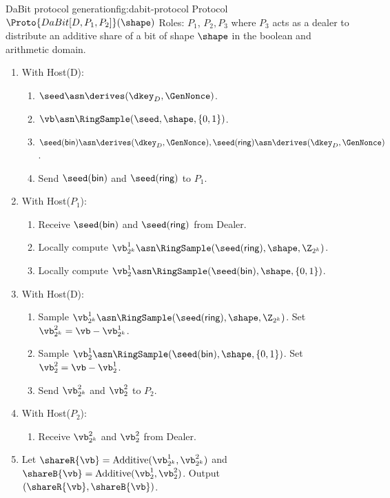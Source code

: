 \begin{Boxfig}{DaBit protocol generation}{fig:dabit-protocol}
  {Protocol $\Proto{DaBit[D, P_1, P_2]}(\shape)$}
  Roles: $P_1$, $P_2, P_3$ where $P_3$ acts as a dealer to distribute
  an additive share of a bit of shape $\shape$ in the boolean and arithmetic domain.
  \begin{enumerate}
  \item With Host(D):
  \begin{enumerate}
    \item $\seed \asn \derives(\dkey_D, \GenNonce)$.
    \item $\vb \asn \RingSample(\seed, \shape, \{0, 1\})$.
    \item $\seed(\textsf{bin}) \asn \derives(\dkey_D, \GenNonce), \seed(\textsf{ring}) \asn \derives(\dkey_D, \GenNonce)$.
    \item Send $\seed(\textsf{bin})$ and $\seed(\textsf{ring})$ to $P_1$.

  \end{enumerate}
  \item  With Host($P_1$):
 \begin{enumerate}
     \item Receive $\seed(\textsf{bin})$ and $\seed(\textsf{ring})$ from Dealer.
     \item Locally compute $\vb^1_{2^k} \asn \RingSample(\seed(\textsf{ring}), \shape, \Z_{2^k})$.
     \item Locally compute $\vb^1_{2} \asn \RingSample(\seed(\textsf{bin}), \shape, \{0, 1\})$.
 \end{enumerate}
\item With Host(D):
\begin{enumerate}
    \item Sample $\vb^1_{2^k} \asn \RingSample(\seed(\textsf{ring}), \shape, \Z_{2^k})$. Set $\vb^2_{2^k} = \vb - \vb^1_{2^k}$.
    \item Sample $\vb^1_{2} \asn \RingSample(\seed(\textsf{bin}), \shape, \{0, 1\})$. Set $\vb^2_{2} = \vb - \vb^1_{2}$. 
    \item Send $\vb^2_{2^k}$ and $\vb^2_2$ to $P_2$.
\end{enumerate}
\item With Host($P_2$):
\begin{enumerate}
    \item Receive $\vb^2_{2^k}$ and $\vb^2_2$ from Dealer.
\end{enumerate}
\item Let $\shareR{\vb} = \text{Additive}(\vb^1_{2^k}, \vb^2_{2^k})$ and $\shareB{\vb} = \text{Additive}(\vb^1_2, \vb^2_2)$. Output $(\shareR{\vb}, \shareB{\vb})$.
\end{enumerate}
\end{Boxfig}

